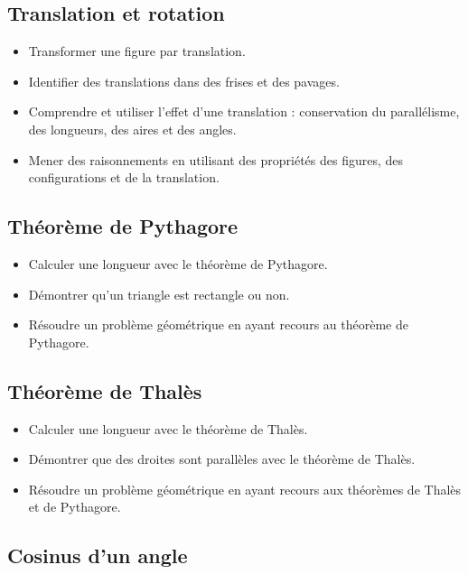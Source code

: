 \documentclass[a4paper,12pt,fleqn]{article}	
\begin{document}
\renewcommand{\labelitemi}{}

\subsection*{Translation et rotation}

\begin{itemize}
	\item {}Transformer une figure par translation.
	\item {}Identifier des translations dans des frises et des pavages.
	\item {}Comprendre et utiliser l’effet d’une translation : conservation du parallélisme, des longueurs, des aires et des angles.
	\item {}Mener des raisonnements en utilisant des propriétés des figures, des configurations et de la translation.
\end{itemize}

\subsection*{Théorème de Pythagore}

\begin{itemize}
	\item {}Calculer une longueur avec le théorème de Pythagore.
	\item {}Démontrer qu'un triangle est rectangle ou non.
	\item {}Résoudre un problème géométrique en ayant recours au théorème de Pythagore.
\end{itemize}

\subsection*{Théorème de Thalès}

\begin{itemize}
	\item {}Calculer une longueur avec le théorème de Thalès.
	\item {}Démontrer que des droites sont parallèles avec le théorème de Thalès.
	\item {}Résoudre un problème géométrique en ayant recours aux théorèmes de Thalès et de Pythagore.
\end{itemize}

\subsection*{Cosinus d'un angle}
\end{document}
